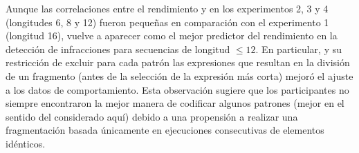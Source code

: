 Aunque las correlaciones entre el rendimiento y \mdlbin en los experimentos 2, 3 y 4 (longitudes 6, 8 y 12) fueron pequeñas en comparación con el experimento 1 (longitud 16), \mdlbin vuelve a aparecer como el mejor predictor del rendimiento en la detección de infracciones para secuencias de longitud $\leq 12$. En particular, \mdlbinfrag y su restricción de excluir para cada patrón las expresiones que resultan en la división de un fragmento (antes de la selección de la expresión más corta) mejoró el ajuste a los datos de comportamiento. Esta observación sugiere que los participantes no siempre encontraron la mejor manera de codificar algunos patrones (mejor en el sentido del \lot considerado aquí) debido a una propensión a realizar una fragmentación basada únicamente en ejecuciones consecutivas de elementos idénticos.


